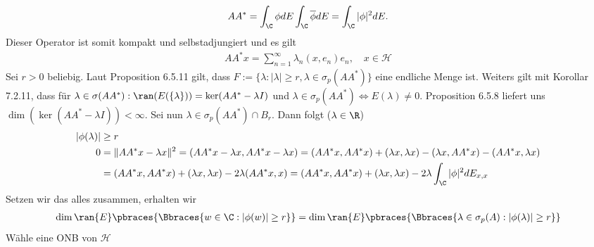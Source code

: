 \begin{solution}
\begin{align*}
  AA^* = \int_{\C} \phi dE\int_{\C} \overline{\phi} dE = \int_{\C} |\phi|^2 dE.
\end{align*}
Dieser Operator ist somit kompakt und selbstadjungiert und es gilt
\begin{align*}
  AA^*x = \sum_{n=1}^{\infty}\lambda_n(x,e_n)e_n, \quad x \in \mathcal{H}
\end{align*}
Sei $r > 0$ beliebig. Laut Proposition 6.5.11 gilt, dass
$F := \{\lambda: |\lambda| \geq r, \lambda \in \sigma_p(AA^*)\}$ eine endliche Menge
ist.
Weiters gilt mit Korollar 7.2.11, dass für
$\lambda \in \sigma(AA^*) : \ran(E(\{\lambda\})) = \ker(AA^* - \lambda I)$
und $\lambda \in \sigma_p(AA^*) \iff E(\lambda) \neq 0$.
Proposition 6.5.8 liefert uns $\dim(\ker(AA^* -\lambda I)) < \infty$.
Sei nun $\lambda \in \sigma_p(AA^*) \cap B_r$. Dann folgt ($\lambda \in \R$)
\begin{align*}
  |\phi(\lambda)| &\geq r \\
  0 &= \|AA^*x - \lambda x\|^2 = (AA^*x - \lambda x,AA^*x - \lambda x)
  = (AA^*x,AA^*x) + (\lambda x, \lambda x) -(\lambda x,AA^*x) - (AA^*x,\lambda x) \\
  &= (AA^*x,AA^*x) + (\lambda x, \lambda x) -2\lambda(AA^*x,x)
  = (AA^*x,AA^*x) + (\lambda x, \lambda x) -2\lambda\int_{\C}|\phi|^2dE_{x,x}
\end{align*}
Setzen wir das alles zusammen, erhalten wir
\begin{align*}
  \dim{\ran{E}}\pbraces{\Bbraces{w \in \C:|\phi(w)| \geq r}} =
  \dim{\ran{E}}\pbraces{\Bbraces{\lambda \in \sigma_p(A):|\phi(\lambda)| \geq r}}
\end{align*}
Wähle eine ONB von $\mathcal{H}$
\end{solution}
